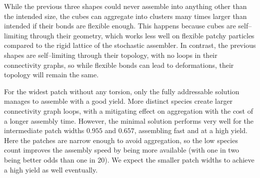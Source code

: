 While the previous three shapes could never assemble into anything other than the intended size, the cubes can aggregate into clusters many times larger than intended if their bonds are flexible enough. This happens because cubes are self--limiting through their geometry, which works less well on flexible patchy particles compared to the rigid lattice of the stochastic assembler. In contrast, the previous shapes are self--limiting through their topology, with no loops in their connectivity graphs, so while flexible bonds can lead to deformations, their topology will remain the same.

For the widest patch without any torsion, only the fully addressable solution manages to assemble with a good yield. More distinct species create larger connectivity graph loops, with a mitigating effect on aggregation with the cost of a longer assembly time. However, the minimal solution performs very well for the intermediate patch widths \(0.955\) and \(0.657\), assembling fast and at a high yield. Here the patches are narrow enough to avoid aggregation, so the low species count improves the assembly speed by being more available (with one in two being better odds than one in 20). We expect the smaller patch widths to achieve a high yield as well eventually.



